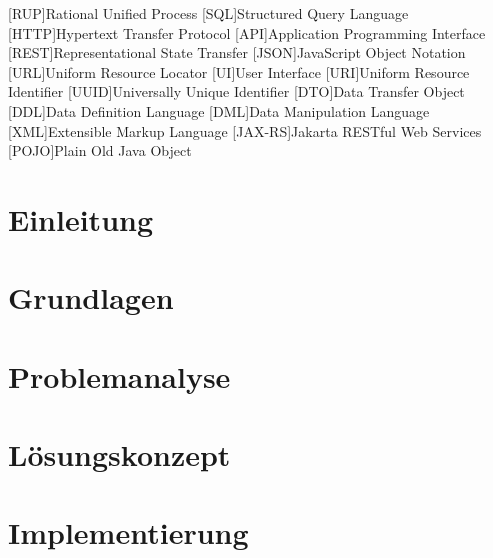 \documentclass[oneside]{ausarbeitung}
\begin{document}
\lstlistoflistings

\listofabbreviations
\begin{acronym}[Bsp.]  %

[RUP]{Rational Unified Process}
[SQL]{Structured Query Language}
[HTTP]{Hypertext Transfer Protocol}
[API]{Application Programming Interface}
[REST]{Representational State Transfer}
[JSON]{JavaScript Object Notation}
[URL]{Uniform Resource Locator}
[UI]{User Interface}   
[URI]{Uniform Resource Identifier}
[UUID]{Universally Unique Identifier}
[DTO]{Data Transfer Object}
[DDL]{Data Definition Language}
[DML]{Data Manipulation Language}
[XML]{Extensible Markup Language}
[JAX-RS]{Jakarta RESTful Web Services}
[POJO]{Plain Old Java Object}
\end{acronym}


\cleardoublepage
{}
\setcounter{page}{1}

\chapter{Einleitung}
\label{cha:einleitung}


\chapter{Grundlagen}
\label{cha:grundlagen}


\chapter{Problemanalyse}
\label{cha:problemanalyse}


\chapter{Lösungskonzept}
\label{cha:loesungskonzept}


\chapter{Implementierung}
\label{cha:implementierung}

\end{document}
